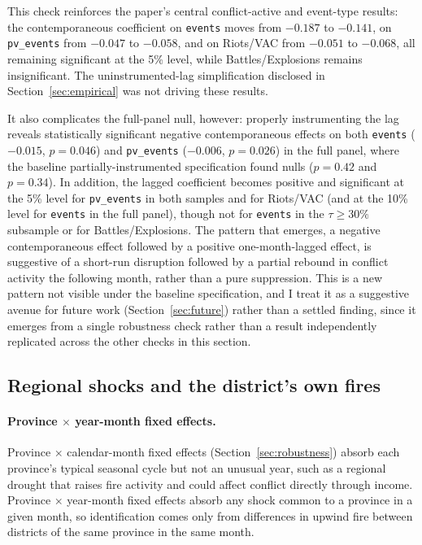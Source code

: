 \documentclass[12pt]{article}
\begin{document}
This check reinforces the paper's central conflict-active and event-type results: the contemporaneous coefficient on \texttt{events} moves from $-0.187$ to $-0.141$, on \texttt{pv\_events} from $-0.047$ to $-0.058$, and on Riots/VAC from $-0.051$ to $-0.068$, all remaining significant at the 5\% level, while Battles/Explosions remains insignificant. The uninstrumented-lag simplification disclosed in Section~\ref{sec:empirical} was not driving these results.

It also complicates the full-panel null, however: properly instrumenting the lag reveals statistically significant negative contemporaneous effects on both \texttt{events} ($-0.015$, $p=0.046$) and \texttt{pv\_events} ($-0.006$, $p=0.026$) in the full panel, where the baseline partially-instrumented specification found nulls ($p=0.42$ and $p=0.34$). In addition, the lagged coefficient becomes positive and significant at the 5\% level for \texttt{pv\_events} in both samples and for Riots/VAC (and at the 10\% level for \texttt{events} in the full panel), though not for \texttt{events} in the $\tau \geq 30\%$ subsample or for Battles/Explosions. The pattern that emerges, a negative contemporaneous effect followed by a positive one-month-lagged effect, is suggestive of a short-run disruption followed by a partial rebound in conflict activity the following month, rather than a pure suppression. This is a new pattern not visible under the baseline specification, and I treat it as a suggestive avenue for future work (Section~\ref{sec:future}) rather than a settled finding, since it emerges from a single robustness check rather than a result independently replicated across the other checks in this section.

\subsection{Regional shocks and the district's own fires}
\label{sec:regional}

\paragraph{Province $\times$ year-month fixed effects.} Province $\times$ calendar-month fixed effects (Section~\ref{sec:robustness}) absorb each province's typical seasonal cycle but not an unusual year, such as a regional drought that raises fire activity and could affect conflict directly through income. Province $\times$ year-month fixed effects absorb any shock common to a province in a given month, so identification comes only from differences in upwind fire between districts of the same province in the same month.
\end{document}
